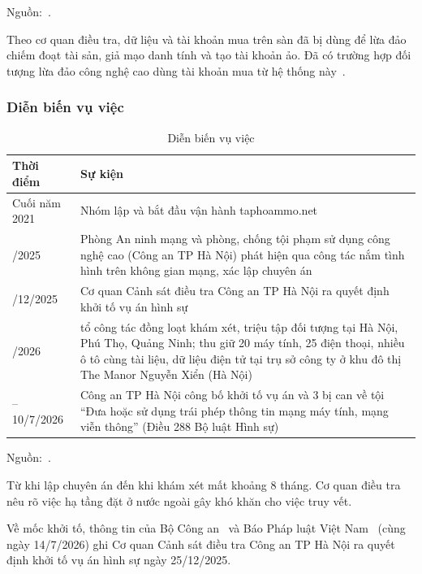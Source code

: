 Nguồn:~\cite{cand-2026,vnn-2026,hnm-2026}.

Theo cơ quan điều tra, dữ liệu và tài khoản mua trên sàn đã bị dùng để lừa đảo chiếm đoạt tài sản, giả mạo danh tính và tạo tài khoản ảo. Đã có trường hợp đối tượng lừa đảo công nghệ cao dùng tài khoản mua từ hệ thống này~\cite{cand-2026}.

\subsubsection{Diễn biến vụ việc}\label{sec:1.1.3}

{\small{}
\begin{table}[H]
\centering
\caption{Diễn biến vụ việc}\label{tab:1.2}
\begin{tabularx}{\textwidth}{>{\raggedright\arraybackslash}l>{\hsize=1.000\hsize\raggedright\arraybackslash}X}
\toprule
\textbf{Thời điểm} & \textbf{Sự kiện} \\
\midrule
Cuối năm 2021 & Nhóm lập và bắt đầu vận hành taphoammo.net \\
6/2025 & Phòng An ninh mạng và phòng, chống tội phạm sử dụng công nghệ cao (Công an TP Hà Nội) phát hiện qua công tác nắm tình hình trên không gian mạng, xác lập chuyên án \\
25/12/2025 & Cơ quan Cảnh sát điều tra Công an TP Hà Nội ra quyết định khởi tố vụ án hình sự \\
2/2026 & 6 tổ công tác đồng loạt khám xét, triệu tập đối tượng tại Hà Nội, Phú Thọ, Quảng Ninh; thu giữ 20 máy tính, 25 điện thoại, nhiều ô tô cùng tài liệu, dữ liệu điện tử tại trụ sở công ty ở khu đô thị The Manor Nguyễn Xiển (Hà Nội) \\
9–10/7/2026 & Công an TP Hà Nội công bố khởi tố vụ án và 3 bị can về tội “Đưa hoặc sử dụng trái phép thông tin mạng máy tính, mạng viễn thông” (Điều 288 Bộ luật Hình sự) \\
\bottomrule
\end{tabularx}
\end{table}}

Nguồn:~\cite{cand-2026,k14-2026,hnm-2026}.

Từ khi lập chuyên án đến khi khám xét mất khoảng 8 tháng. Cơ quan điều tra nêu rõ việc hạ tầng đặt ở nước ngoài gây khó khăn cho việc truy vết.

Về mốc khởi tố, thông tin của Bộ Công an~\cite{bca-2026} và Báo Pháp luật Việt Nam~\cite{bpl-2026} (cùng ngày 14/7/2026) ghi Cơ quan Cảnh sát điều tra Công an TP Hà Nội ra quyết định khởi tố vụ án hình sự ngày 25/12/2025.

